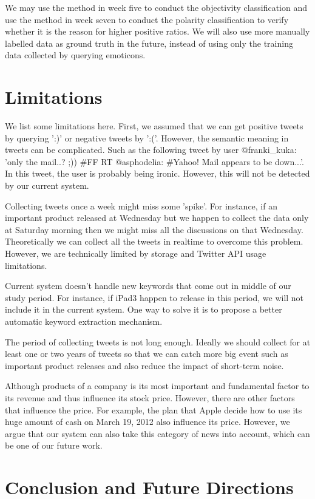 \documentclass[12pt]{article}
\begin{document}
We may use the method in week five to conduct the objectivity classification and use the method in week seven to conduct the polarity classification to verify whether it is the reason for higher positive ratios. We will also use more manually labelled data as ground truth in the future, instead of using only the training data collected by querying emoticons.

\section{Limitations}
We list some limitations here. First, we assumed that we can get positive tweets by querying ':)' or negative tweets by ':('. However, the semantic meaning in tweets can be complicated. Such as the following tweet by user @franki\_kuka: 'only the mail..? ;)) \#FF RT @asphodelia: \#Yahoo! Mail appears to be down...'. In this tweet, the user is probably being ironic. However, this will not be detected by our current system.

Collecting tweets once a week might miss some 'spike'. For instance, if an important product released at Wednesday but we happen to collect the data only at Saturday morning then we might miss all the discussions on that Wednesday. Theoretically we can collect all the tweets in realtime to overcome this problem. However, we are technically limited by storage and Twitter API usage limitations.

Current system doesn't handle new keywords that come out in middle of our study period. For instance, if iPad3 happen to release in this period, we will not include it in the current system. One way to solve it is to propose a better automatic keyword extraction mechanism.

The period of collecting tweets is not long enough. Ideally we should collect for at least one or two years of tweets so that we can catch more big event such as important product releases and also reduce the impact of short-term noise.

Although products of a company is its most important and fundamental factor to its revenue and thus influence its stock price. However, there are other factors that influence the price. For example, the plan that Apple decide how to use its huge amount of cash on March 19, 2012 also influence its price. However, we argue that our system can also take this category of news into account, which can be one of our future work.

\section{Conclusion and Future Directions}
\end{document}
